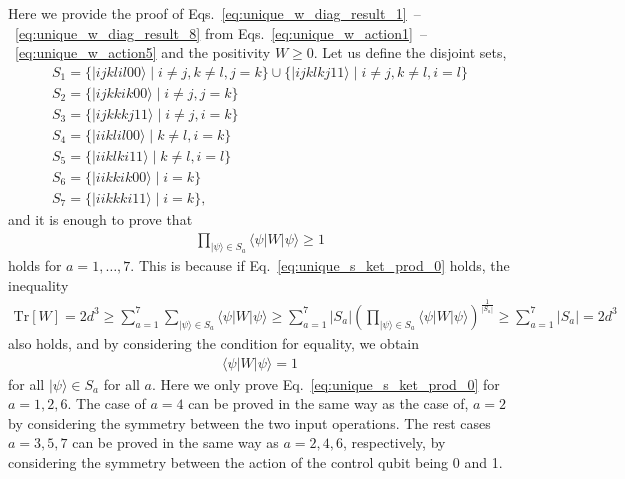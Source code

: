 \documentclass[a4paper,twocolumn,accepted=2022-10-23]{quantumarticle}
\newcommand{\bra}[1]{\langle {#1} \vert}
\newcommand{\ket}[1]{\vert {#1} \rangle}
\newcommand{\Tr}[0]{{\mathrm{Tr}}}
\theoremstyle{definition}
\begin{document}
Here we provide the proof of Eqs.~\eqref{eq:unique_w_diag_result_1}~--~\eqref{eq:unique_w_diag_result_8}
from Eqs.~\eqref{eq:unique_w_action1}~--~\eqref{eq:unique_w_action5} and the positivity $W \geq 0$.
Let us define the disjoint sets,
\begin{gather}
S_1 = \{ \ket{ijklil00} \mid i \neq j, k \neq l, j = k \} \cup \{ \ket{ijklkj11} \mid i \neq j, k \neq l, i = l \} \\
S_2 = \{ \ket{ijkkik00} \mid i \neq j, j = k \} \\
S_3 = \{ \ket{ijkkkj11} \mid i \neq j, i = k \} \\
S_4 = \{ \ket{iiklil00} \mid k \neq l, i = k \} \\
S_5 = \{ \ket{iiklki11} \mid k \neq l, i = l \} \\
S_6 = \{ \ket{iikkik00} \mid i = k \} \\
S_7 = \{ \ket{iikkki11} \mid i = k \},
\end{gather}
and it is enough to prove that
\begin{align}
\prod_{\ket{\psi} \in S_a} \bra{\psi} W \ket{\psi} \geq 1 \label{eq:unique_s_ket_prod_0}
\end{align}
holds for $a=1,\ldots,7$.
This is because if Eq.~\eqref{eq:unique_s_ket_prod_0} holds, the inequality
\begin{align}
\Tr [W] = 2d^3 \geq \sum_{a=1}^7 \sum_{\ket{\psi} \in S_a} \bra{\psi} W \ket{\psi}
\geq \sum_{a=1}^7 |S_a| \left( \prod_{\ket{\psi} \in S_a} \bra{\psi} W \ket{\psi} \right)^{\frac{1}{|S_a|}}
\geq \sum_{a=1}^7 |S_a| = 2d^3
\end{align}
also holds, and by considering the condition for equality, we obtain
\begin{align}
\bra{\psi} W \ket{\psi} = 1
\end{align}
for all $\ket{\psi} \in S_a$ for all $a$.
Here we only prove Eq.~\eqref{eq:unique_s_ket_prod_0} for $a=1,2,6$.
The case of $a=4$ can be proved in the same way as the case of, $a=2$ by considering the symmetry between the two input operations.
The rest cases $a=3,5,7$ can be proved in the same way as $a=2,4,6$, respectively, by considering the symmetry between the action of the control qubit being 0 and 1.
\end{document}
